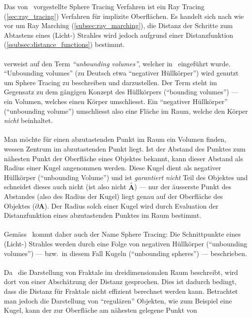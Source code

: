 Das von~\cite{hart_sphere_1994} vorgestellte Sphere Tracing Verfahren ist ein
Ray Tracing (\ref{sec:ray_tracing}) Verfahren für implizite Oberflächen. Es
handelt sich nach wie vor um Ray Marching (\ref{subsec:ray_marching}), die
Distanz der Schritte zum Abtastens  eines (Licht-) Strahles wird jedoch
aufgrund einer Distanzfunktion (\ref{ssubsec:distance_functions}) bestimmt.\\
\\
\cite{hart_sphere_1994} verweist auf den Term \textit{``unbounding volumes''},
welcher in~\cite{hart_ray_1989} eingeführt wurde. ``Unbounding volumes'' (zu
Deutsch etwa ``negativer Hüllkörper'') wird genutzt um Sphere Tracing zu
beschreiben und darzustellen. Der Term steht im Gegensatz zu dem gängigen
Konzept des Hüllkörpers (``bounding volumes'') --- ein Volumen, welches einen
Körper umschliesst. Ein ``negativer Hüllkörper'' (``unbounding volume'')
umschliesst also eine Fläche im Raum, welche den Körper \textit{nicht}
beinhaltet.\\
\\
Man möchte für einen abzutastenden Punkt im Raum ein Volumen finden, wessen
Zentrum im abzutastenden Punkt liegt. Ist der Abstand des Punktes zum nähesten
Punkt der Oberfläche eines Objektes bekannt, kann dieser Abstand als Radius
einer Kugel angenommen werden. Diese Kugel dient als negativer Hüllkörper
(``unbounding Volume'') und ist \textit{garantiert nicht} Teil des Objektes und
schneidet dieses auch nicht (ist also nicht $\overset{\circ}{\bm{A}}$) --- nur
der äusserste Punkt des Abstandes (also des Radius der Kugel) liegt genau auf
der Oberfläche des Objektes ($\partial \bm{A}$). Der Radius solch einer Kugel
wird durch Evaluation der Distanzfunktion eines abzutastenden Punktes im Raum
bestimmt.\\
\\
Gemäss~\cite{hart_sphere_1994} kommt daher auch der Name Sphere Tracing: Die
Schnittpunkte eines (Licht-) Strahles werden durch eine Folge von negativen
Hüllkörper (``unbounding volumes'') --- bzw.\ in diesem Fall Kugeln
(``unbounding spheres'') --- beschrieben.\\
\\
Da~\cite{hart_ray_1989} die Darstellung von Fraktale im dreidimensionalen Raum
beschreibt, wird dort von einer Abschätzung der Distanz gesprochen. Dies ist
dadurch bedingt, dass die Distanz für Fraktale nicht effizient berechnet werden
kann. Betrachtet man jedoch die Darstellung von  ``regulären'' Objekten, wie zum
Beispiel eine Kugel, kann der zur Oberfläche am nähesten gelegene Punkt von
